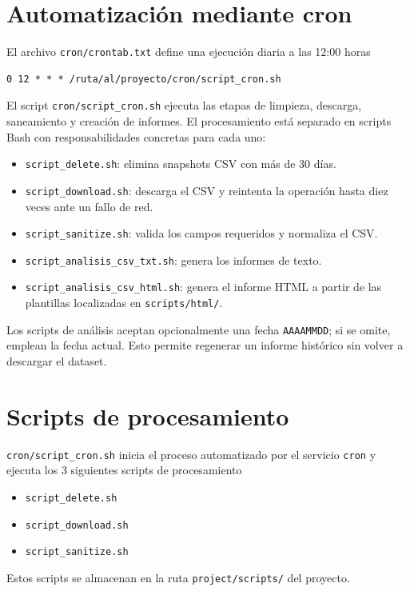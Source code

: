\documentclass[11pt,a4paper]{article}
\begin{document}
\section{Automatización mediante cron}
El archivo \texttt{cron/crontab.txt} define una ejecución diaria a las 12:00 horas
\begin{verbatim}
0 12 * * * /ruta/al/proyecto/cron/script_cron.sh
\end{verbatim}
El script \texttt{cron/\allowbreak script\_cron.sh} ejecuta las etapas de limpieza, descarga, saneamiento y creación de informes. El procesamiento está separado en scripts Bash con responsabilidades concretas para cada uno:
\begin{itemize}[noitemsep]
  \item \texttt{script\_delete.sh}: elimina snapshots CSV con más de 30 días.
  \item \texttt{script\_download.sh}: descarga el CSV y reintenta la operación hasta diez veces ante un fallo de red.
  \item \texttt{script\_sanitize.sh}: valida los campos requeridos y normaliza el CSV.
  \item \texttt{script\_analisis\_csv\_txt.sh}: genera los informes de texto.
  \item \texttt{script\_analisis\_csv\_html.sh}: genera el informe HTML a partir de las plantillas localizadas en \texttt{scripts/html/}.
\end{itemize}
Los scripts de análisis aceptan opcionalmente una fecha \texttt{AAAAMMDD}; si se omite, emplean la fecha actual. Esto permite regenerar un informe histórico sin volver a descargar el dataset.

\newpage
\section{Scripts de procesamiento}

\texttt{cron/\allowbreak script\_cron.sh} inicia el proceso automatizado por el servicio \texttt{cron} y ejecuta los 3 siguientes scripts de procesamiento

\begin{itemize}[noitemsep]
    \item \texttt{script\_delete.sh}
    \item \texttt{script\_download.sh}
    \item \texttt{script\_sanitize.sh}
\end{itemize}

Estos scripts se almacenan en la ruta \texttt{project/scripts/} del proyecto.
\end{document}
